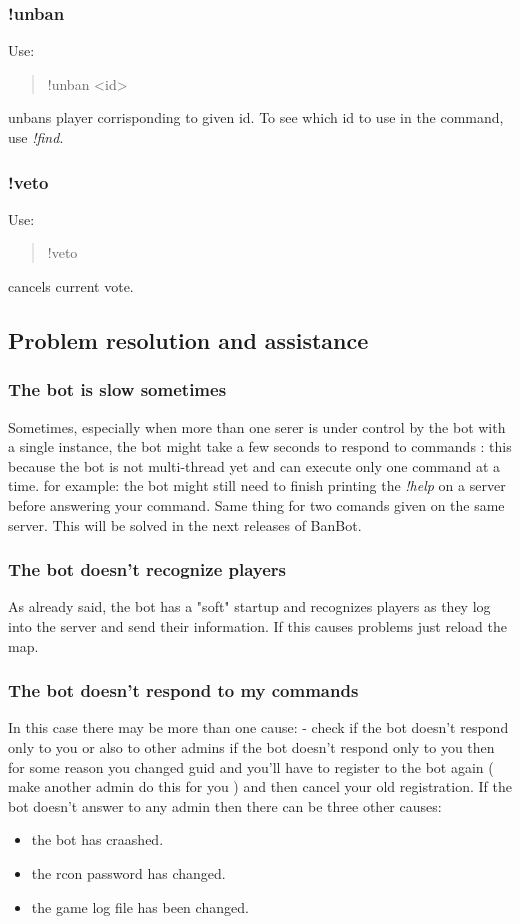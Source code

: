 \documentclass[a4paper]{article}
\begin{document}
\subsubsection{!unban}
Use:
\begin{quote}
!unban \textless{}id\textgreater{}
\end{quote}
unbans player corrisponding to given id. To see which id to use in the command,  use \textit{!find}.

\subsubsection{!veto}
Use:
\begin{quote}
!veto
\end{quote}
cancels current vote.

\newpage
\subsection{Problem resolution and assistance}

\subsubsection{The bot is slow sometimes}
Sometimes, especially when more than one serer is under control by the bot with a single instance, the bot might take a few seconds to respond to
commands : this because the bot is not multi-thread yet and can execute only one command at a time.
for example:
the bot might still need to finish printing the \textit{!help} on a server before answering your command.
Same thing for two comands given on the same server. This will be solved in the next releases of BanBot.\\

\subsubsection{The bot doesn't recognize players}
As already said, the bot has a "soft" startup and recognizes players as they log into the server and send their information.
If this causes problems just reload the map.\\

\subsubsection{The bot doesn't respond to my commands}
In this case there may be more than one cause:
- check if the bot doesn't respond only to you or also to other admins
if the bot doesn't respond only to you then for some reason you changed guid and you'll have to register to the bot again ( make another admin
    do this for you ) and then cancel your old registration.
If the bot doesn't answer to any admin then there can be three other causes:
\begin{itemize}
\item the bot has craashed.
\item the rcon password has changed.
\item the game log file has been changed.
\end{itemize}
\end{document}
